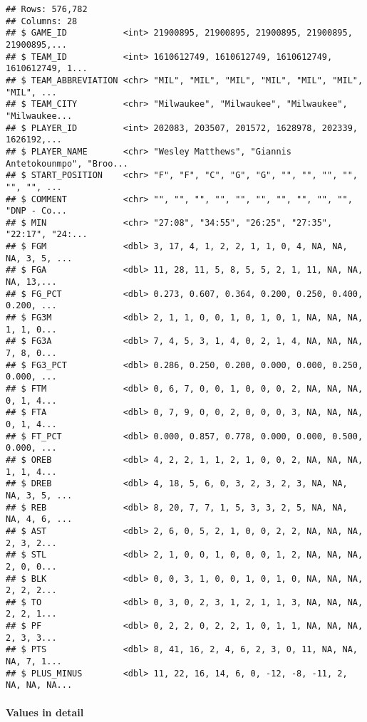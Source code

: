 \documentclass[
]{article}
\begin{document}
\begin{verbatim}
## Rows: 576,782
## Columns: 28
## $ GAME_ID           <int> 21900895, 21900895, 21900895, 21900895, 21900895,...
## $ TEAM_ID           <int> 1610612749, 1610612749, 1610612749, 1610612749, 1...
## $ TEAM_ABBREVIATION <chr> "MIL", "MIL", "MIL", "MIL", "MIL", "MIL", "MIL", ...
## $ TEAM_CITY         <chr> "Milwaukee", "Milwaukee", "Milwaukee", "Milwaukee...
## $ PLAYER_ID         <int> 202083, 203507, 201572, 1628978, 202339, 1626192,...
## $ PLAYER_NAME       <chr> "Wesley Matthews", "Giannis Antetokounmpo", "Broo...
## $ START_POSITION    <chr> "F", "F", "C", "G", "G", "", "", "", "", "", "", ...
## $ COMMENT           <chr> "", "", "", "", "", "", "", "", "", "", "DNP - Co...
## $ MIN               <chr> "27:08", "34:55", "26:25", "27:35", "22:17", "24:...
## $ FGM               <dbl> 3, 17, 4, 1, 2, 2, 1, 1, 0, 4, NA, NA, NA, 3, 5, ...
## $ FGA               <dbl> 11, 28, 11, 5, 8, 5, 5, 2, 1, 11, NA, NA, NA, 13,...
## $ FG_PCT            <dbl> 0.273, 0.607, 0.364, 0.200, 0.250, 0.400, 0.200, ...
## $ FG3M              <dbl> 2, 1, 1, 0, 0, 1, 0, 1, 0, 1, NA, NA, NA, 1, 1, 0...
## $ FG3A              <dbl> 7, 4, 5, 3, 1, 4, 0, 2, 1, 4, NA, NA, NA, 7, 8, 0...
## $ FG3_PCT           <dbl> 0.286, 0.250, 0.200, 0.000, 0.000, 0.250, 0.000, ...
## $ FTM               <dbl> 0, 6, 7, 0, 0, 1, 0, 0, 0, 2, NA, NA, NA, 0, 1, 4...
## $ FTA               <dbl> 0, 7, 9, 0, 0, 2, 0, 0, 0, 3, NA, NA, NA, 0, 1, 4...
## $ FT_PCT            <dbl> 0.000, 0.857, 0.778, 0.000, 0.000, 0.500, 0.000, ...
## $ OREB              <dbl> 4, 2, 2, 1, 1, 2, 1, 0, 0, 2, NA, NA, NA, 1, 1, 4...
## $ DREB              <dbl> 4, 18, 5, 6, 0, 3, 2, 3, 2, 3, NA, NA, NA, 3, 5, ...
## $ REB               <dbl> 8, 20, 7, 7, 1, 5, 3, 3, 2, 5, NA, NA, NA, 4, 6, ...
## $ AST               <dbl> 2, 6, 0, 5, 2, 1, 0, 0, 2, 2, NA, NA, NA, 2, 3, 2...
## $ STL               <dbl> 2, 1, 0, 0, 1, 0, 0, 0, 1, 2, NA, NA, NA, 2, 0, 0...
## $ BLK               <dbl> 0, 0, 3, 1, 0, 0, 1, 0, 1, 0, NA, NA, NA, 2, 2, 2...
## $ TO                <dbl> 0, 3, 0, 2, 3, 1, 2, 1, 1, 3, NA, NA, NA, 2, 2, 1...
## $ PF                <dbl> 0, 2, 2, 0, 2, 2, 1, 0, 1, 1, NA, NA, NA, 2, 3, 3...
## $ PTS               <dbl> 8, 41, 16, 2, 4, 6, 2, 3, 0, 11, NA, NA, NA, 7, 1...
## $ PLUS_MINUS        <dbl> 11, 22, 16, 14, 6, 0, -12, -8, -11, 2, NA, NA, NA...
\end{verbatim}

\hypertarget{values-in-detail}{%
\paragraph{Values in detail}\label{values-in-detail}}
\end{document}
